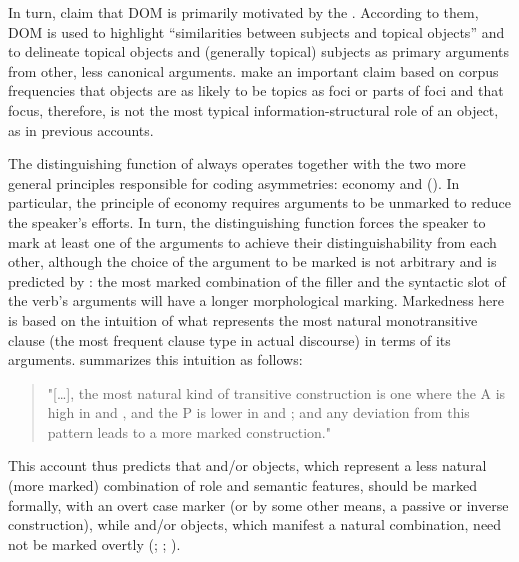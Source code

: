 \documentclass[output=paper]{LSP/langsci}
\begin{document}
In turn, \citet{Dalrympleetal2011Objects} claim that DOM is primarily motivated by the . 
According to them, DOM is used to highlight “similarities between subjects and topical objects” \citep[3--8]{Dalrympleetal2011Objects} and to delineate topical objects and (generally topical) subjects as primary arguments from other, less canonical arguments. 
\citet{Dalrympleetal2011Objects} make an important claim based on corpus frequencies that objects are as likely to be topics as foci or parts of foci and that focus, therefore, is not the most typical information-structural role of an object, as in previous accounts.

The distinguishing function of  always operates together with the two more general principles responsible for coding asymmetries: economy and  (\cf \citealt{deSwart2006Case, deSwart2007Cross-linguistic, Hoopetal2008Case-marking}). 
In particular, the principle of economy requires arguments to be unmarked to reduce the speaker’s efforts. 
In turn, the distinguishing function forces the speaker to mark at least one of the arguments to achieve their distinguishability from each other, although the choice of the argument to be marked is not arbitrary and is predicted by : the most marked combination of the filler and the syntactic slot of the verb’s arguments will have a longer morphological marking. 
Markedness here is based on the intuition of what represents the most natural monotransitive clause (\eg the most frequent clause type in actual discourse) in terms of its arguments. 
\citet{Comrie1989Language} summarizes this intuition as follows:

\begin{quote}
"[…], the most natural kind of transitive construction is one where the A is high in  and , and the P is lower in  and ; and any deviation from this pattern leads to a more marked construction." \citep[128]{Comrie1989Language}
\end{quote}

This account thus predicts that  and/or  objects, which represent a less natural (\ie more marked) combination of role and semantic features, should be marked formally, \eg with an overt case marker (or by some other means, \eg a passive or inverse construction), while  and/or  objects, which manifest a natural combination, need not be marked overtly (\cf \citealt[128]{Comrie1989Language}; \citealt[162--163]{Bossong1991Differential}; \citealt{Malchukov2008Animacy}). 
\end{document}

